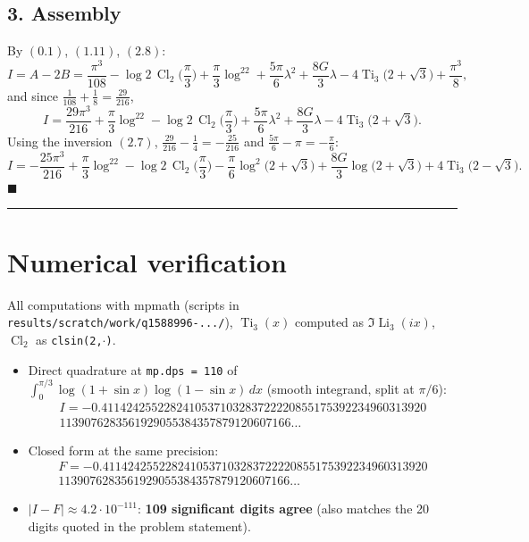 \documentclass[11pt]{article}
\theoremstyle{remark}
\begin{document}
\subsection*{3. Assembly}

By $(0.1)$, $(1.11)$, $(2.8)$:
\[
I=A-2B=\frac{\pi^3}{108}-\log2\,\operatorname{Cl}_2\!\Big(\frac\pi3\Big)+\frac{\pi}{3}\log^22
+\frac{5\pi}{6}\lambda^2+\frac{8G}{3}\lambda-4\operatorname{Ti}_3\!\big(2+\sqrt3\big)+\frac{\pi^3}{8},
\]
and since $\frac{1}{108}+\frac18=\frac{29}{216}$,
\[
I=\frac{29\pi^3}{216}+\frac{\pi}{3}\log^22-\log2\,\operatorname{Cl}_2\!\Big(\frac\pi3\Big)+\frac{5\pi}{6}\lambda^2+\frac{8G}{3}\lambda-4\operatorname{Ti}_3\!\big(2+\sqrt3\big).
\]
Using the inversion $(2.7)$, $\frac{29}{216}-\frac14=-\frac{25}{216}$ and $\frac{5\pi}6-\pi=-\frac\pi6$:
\[
I=-\frac{25\pi^3}{216}+\frac{\pi}{3}\log^22-\log2\,\operatorname{Cl}_2\!\Big(\frac\pi3\Big)
-\frac{\pi}{6}\log^2\!\big(2+\sqrt3\big)+\frac{8G}{3}\log\!\big(2+\sqrt3\big)+4\operatorname{Ti}_3\!\big(2-\sqrt3\big).
\]
$\blacksquare$

\begin{center}\rule{0.6\textwidth}{0.4pt}\end{center}

\section*{Numerical verification}

All computations with mpmath (scripts in \texttt{results/scratch/work/q1588996-.../}), $\operatorname{Ti}_3(x)$ computed as $\Im\operatorname{Li}_3(ix)$, $\operatorname{Cl}_2$ as \texttt{clsin(2,$\cdot$)}.

\begin{itemize}
\item Direct quadrature at \texttt{mp.dps = 110} of $\int_0^{\pi/3}\log(1+\sin x)\log(1-\sin x)\,dx$ (smooth integrand, split at $\pi/6$):
\begin{multline*}
I=-0.4114242552282410537103283722220855175392234960313920\\
1139076283561929055384357879120607166\ldots
\end{multline*}
\item Closed form at the same precision:
\begin{multline*}
F=-0.4114242552282410537103283722220855175392234960313920\\
1139076283561929055384357879120607166\ldots
\end{multline*}
\item $|I-F|\approx4.2\cdot10^{-111}$: \textbf{109 significant digits agree} (also matches the 20 digits quoted in the problem statement).
\end{itemize}
\end{document}
